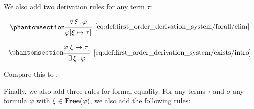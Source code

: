 \begin{definition}
\begin{thmenum}
     We also add two \hyperref[def:proof_derivation_system/rules]{derivation rules} for any term \( \tau \):

    \begin{minipage}{0.45\textwidth}
      \begin{equation*}\taglabel[\textrm{R} \( \forall^- \)]{eq:def:first_order_derivation_system/forall/elim}
        \begin{prooftree}
          \hypo{ \qforall \xi \varphi }
          \infer1[\ref{eq:def:first_order_derivation_system/forall/elim}]{ \varphi[\xi \mapsto \tau] }
        \end{prooftree}
      \end{equation*}
    \end{minipage}
    \hfill
    \begin{minipage}{0.45\textwidth}
      \begin{equation*}\taglabel[\textrm{R} \( \exists^+ \)]{eq:def:first_order_derivation_system/exists/intro}
        \begin{prooftree}
          \hypo{ \varphi[\xi \mapsto \tau] }
          \infer1[\ref{eq:def:first_order_derivation_system/exists/intro}]{ \qexists \xi \varphi }
        \end{prooftree}
      \end{equation*}
    \end{minipage}

    Compare this to .

     Finally, we also add three rules for formal equality. For any terms \( \tau \) and \( \sigma \) any formula \( \varphi \) with \( \xi \in \operatorname{\mathbf{Free}}(\varphi) \), we also add the following rules:


\end{thmenum}
\end{definition}

